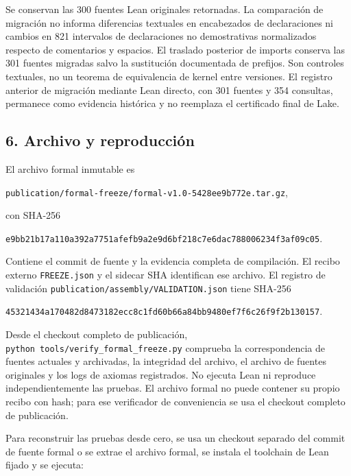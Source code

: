 \documentclass[spanish,11pt,a4paper]{article}
\begin{document}
Se conservan las 300 fuentes Lean originales retornadas. La comparación de migración no informa diferencias textuales en encabezados de declaraciones ni cambios en 821 intervalos de declaraciones no demostrativas normalizados respecto de comentarios y espacios. El traslado posterior de imports conserva las 301 fuentes migradas salvo la sustitución documentada de prefijos. Son controles textuales, no un teorema de equivalencia de kernel entre versiones. El registro anterior de migración mediante Lean directo, con 301 fuentes y 354 consultas, permanece como evidencia histórica y no reemplaza el certificado final de Lake.

\subsection{6. Archivo y reproducción}\label{archivo-y-reproducciuxf3n}

El archivo formal inmutable es

\texttt{publication/\allowbreak{}formal-freeze/\allowbreak{}formal-v1.\allowbreak{}0-5428ee9b772e.\allowbreak{}tar.\allowbreak{}gz},

con SHA-256

\texttt{e9bb21b1\allowbreak{}7a110a39\allowbreak{}2a7751af\allowbreak{}efb9a2e9\allowbreak{}d6bf218c\allowbreak{}7e6dac78\allowbreak{}8006234f\allowbreak{}3af09c05}.

Contiene el commit de fuente y la evidencia completa de compilación. El recibo externo \texttt{FREEZE.\allowbreak{}json} y el sidecar SHA identifican ese archivo. El registro de validación \texttt{publication/\allowbreak{}assembly/\allowbreak{}VALIDATION.\allowbreak{}json} tiene SHA-256

\texttt{45321434\allowbreak{}a170482d\allowbreak{}8473182e\allowbreak{}cc8c1fd6\allowbreak{}0b66a84b\allowbreak{}b9480ef7\allowbreak{}f6c26f9f\allowbreak{}2b130157}.

Desde el checkout completo de publicación, \texttt{python\ tools/\allowbreak{}verify\_\allowbreak{}formal\_\allowbreak{}freeze.\allowbreak{}py} comprueba la correspondencia de fuentes actuales y archivadas, la integridad del archivo, el archivo de fuentes originales y los logs de axiomas registrados. No ejecuta Lean ni reproduce independientemente las pruebas. El archivo formal no puede contener su propio recibo con hash; para ese verificador de conveniencia se usa el checkout completo de publicación.

Para reconstruir las pruebas desde cero, se usa un checkout separado del commit de fuente formal o se extrae el archivo formal, se instala el toolchain de Lean fijado y se ejecuta:
\end{document}
